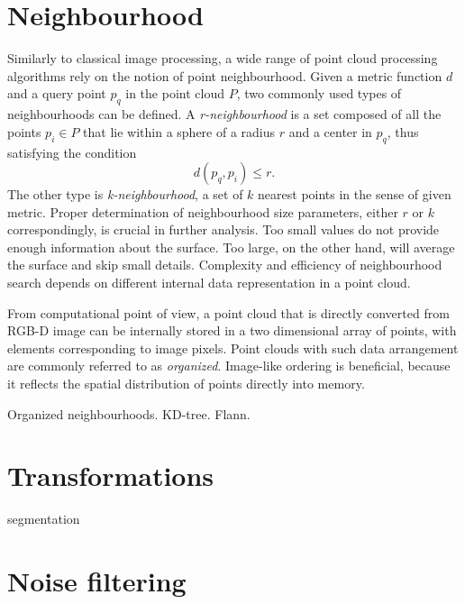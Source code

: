 
\section{Neighbourhood}
\label{sec:neighbourhood}

Similarly to classical image processing, a wide range of point cloud processing algorithms rely on the notion of point neighbourhood. Given a metric function $d$ and a query point $p_q$ in the point cloud $P$, two commonly used types of neighbourhoods can be defined. A \textit{r-neighbourhood} is a set composed of all the points $p_i \in P$ that lie within a sphere of a radius $r$ and a center in $p_q$, thus satisfying the condition
\begin{equation}
d(p_	q, p_i) \leq r.
\end{equation}
The other type is \textit{k-neighbourhood}, a set of $k$ nearest points in the sense of given metric. Proper determination of neighbourhood size parameters, either $r$ or $k$ correspondingly, is crucial in further analysis. Too small values do not provide enough information about the surface. Too large, on the other hand, will average the surface and skip small details. Complexity and efficiency of neighbourhood search depends on different internal data representation in a point cloud.

From computational point of view, a point cloud that is directly converted from RGB-D image can be internally stored in a two dimensional array of points, with elements corresponding to image pixels. Point clouds with such data arrangement are commonly referred to as \textit{organized}. Image-like ordering is beneficial, because it reflects the spatial distribution of points directly into memory.



Organized neighbourhoods.
KD-tree.
Flann.



\section{Transformations}
\label{sec:transformations}

segmentation



\section{Noise filtering}
\label{sec:segmentation}

